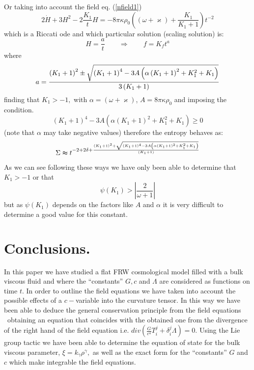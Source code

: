\documentclass{revtex4}
\begin{document}
Or taking into account the field eq. (\ref{nfield1})
\begin{equation}
2\dot{H}+3H^{2}-2\frac{K_{1}}{t}H=-8\pi \kappa \rho _{0}\left( \left( \omega
+\varkappa \right) +\frac{K_{1}}{K_{1}+1}\right) t^{-2}
\end{equation}
which is a Riccati ode and which particular solution (scaling solution) is:
\begin{equation}
H=\frac{a}{t}\qquad \Longrightarrow \qquad f=K_{f}t^{a}
\end{equation}
where
\begin{equation}
a=\frac{\left( K_{1}+1\right) ^{2}\pm \sqrt{\left( K_{1}+1\right)
^{4}-3A\left( \alpha \left( K_{1}+1\right) ^{2}+K_{1}^{2}+K_{1}\right) }}{%
3\left( K_{1}+1\right) }
\end{equation}
finding that $K_{1}>-1,$ with $\alpha =\left( \omega +\varkappa \right) $, $%
A=8\pi \kappa \rho _{0}$ and imposing the condition$.$%
\begin{equation}
\left( K_{1}+1\right) ^{4}-3A\left( \alpha \left( K_{1}+1\right)
^{2}+K_{1}^{2}+K_{1}\right) \geq 0
\end{equation}
(note that $\alpha $ may take negative values) therefore the entropy behaves
as:
\begin{equation}
\Sigma \thickapprox t^{-2+2\delta +\frac{\left( K_{1}+1\right) ^{2}+\sqrt{%
\left( K_{1}+1\right) ^{4}-3A\left( \alpha \left( K_{1}+1\right)
^{2}+K_{1}^{2}+K_{1}\right) }}{\left( K_{1}+1\right) }}
\end{equation}

As we can see following these ways we have only been able to determine that $%
K_{1}>-1$ or that
\begin{equation}
\psi (K_{1})>\left| \frac{2}{\omega +1}\right|
\end{equation}
but as $\psi (K_{1})$ depends on the factors like $A$ and $\alpha $ it is
very difficult to determine a good value for this constant.

\section{Conclusions.}

In this paper we have studied a flat FRW cosmological model filled with a
bulk viscous fluid and where the ``constants'' $G,c$ and $\Lambda $ are
considered as functions on time $t.$ In order to outline the field equations
we have taken into account the possible effects of a $c-$variable into the
curvature tensor. In this way we have been able to deduce the general
conservation principle from the field equations \ obtaining an equation that
coincides with the obtained one from the divergence of the right hand of the
field equation i.e. $div\left( \frac{G}{c^{4}}T_{i}^{j}+\delta
_{i}^{j}\Lambda \right) =0.$ Using the Lie group tactic we have been able to
determine the equation of state for the bulk viscous parameter, $\xi
=k_{\gamma }\rho ^{\gamma },$ as well as the exact form for the
``constants'' $G$ and $c$ which make integrable the field equations.
\end{document}
